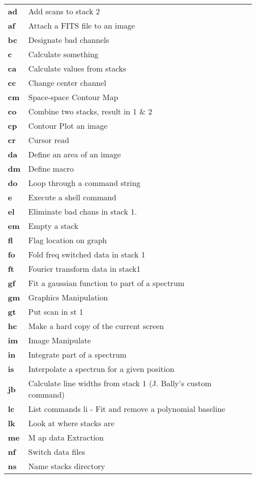\begin{tabular}{ll}
{\bf ad} & Add scans to stack 2 \\
{\bf af} & Attach a FITS file to an image \\
{\bf bc} & Designate bad channels \\
{\bf c}  & Calculate something \\
{\bf ca} & Calculate values from stacks \\
{\bf cc} & Change center channel \\
{\bf cm} & Space-space Contour Map \\
{\bf co} & Combine two stacks, result in 1 \& 2\\
{\bf cp} & Contour Plot an image\\
{\bf cr} & Cursor read\\
{\bf da} & Define an area of an image\\
{\bf dm} & Define macro\\
{\bf do} & Loop through a command string\\
{\bf e}  & Execute a shell command\\
{\bf el} & Eliminate bad chans in stack 1.\\
{\bf em} & Empty a stack\\
{\bf fl} & Flag location on graph\\
{\bf fo} & Fold freq switched data in stack 1\\
{\bf ft} & Fourier transform data in stack1\\
{\bf gf} & Fit a gaussian function to part of a spectrum\\
{\bf gm} & Graphics Manipulation\\
{\bf gt} & Put scan in st 1\\
{\bf hc} & Make a hard copy of the current screen\\
{\bf im} & Image Manipulate \\
{\bf in} & Integrate part of a spectrum \\
{\bf is} & Interpolate a spectrun for a given position\\
{\bf jb} & Calculate line widths from stack 1 (J. Bally's custom command)\\
{\bf lc} & List commands li - Fit and remove a polynomial baseline \\
{\bf lk} & Look at where stacks are\\
{\bf me} & M ap data Extraction\\
{\bf nf} & Switch data files\\
{\bf ns} & Name stacks directory\\

\end{tabular}
